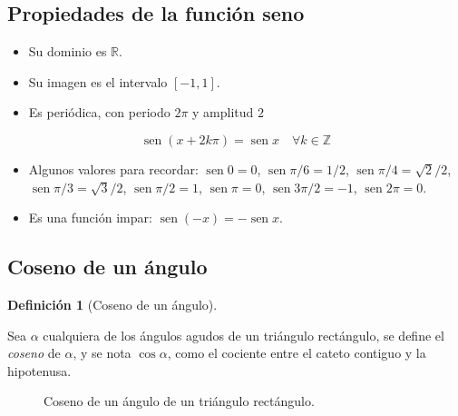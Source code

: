 \documentclass[
  a4paper,
]{scrreport}
\providecommand{\tightlist}{%
  \setlength{\itemsep}{0pt}\setlength{\parskip}{0pt}}\usepackage{longtable,booktabs,array}
\theoremstyle{plain}
\theoremstyle{plain}
\theoremstyle{definition}
\newtheorem{definition}{Definición}[chapter]
\theoremstyle{plain}
\theoremstyle{definition}
\theoremstyle{remark}
\begin{document}
\hypertarget{propiedades-de-la-funciuxf3n-seno}{%
\subsection{Propiedades de la función
seno}\label{propiedades-de-la-funciuxf3n-seno}}

\begin{itemize}
\tightlist
\item
  Su dominio es \(\mathbb{R}\).
\item
  Su imagen es el intervalo \([-1,1]\).
\item
  Es periódica, con periodo \(2\pi\) y amplitud \(2\)
\end{itemize}

\[\operatorname{sen} (x+2k\pi)= \operatorname{sen} x\quad \forall k\in \mathbb{Z}\]

\begin{itemize}
\tightlist
\item
  Algunos valores para recordar: \(\operatorname{sen} 0=0\),
  \(\operatorname{sen} \pi/6= 1/2\),
  \(\operatorname{sen} \pi/4=\sqrt{2}/2\),
  \(\operatorname{sen} \pi/3= \sqrt{3}/2\),
  \(\operatorname{sen} \pi/2 =1\), \(\operatorname{sen} \pi = 0\),
  \(\operatorname{sen} 3\pi/2=-1\), \(\operatorname{sen} 2\pi=0\).
\item
  Es una función impar:
  \(\operatorname{sen}(-x)=-\operatorname{sen} x\).
\end{itemize}

\hypertarget{coseno-de-un-uxe1ngulo}{%
\subsection{Coseno de un ángulo}\label{coseno-de-un-uxe1ngulo}}

\leavevmode{}%
\begin{definition}[Coseno de un ángulo]\label{def-coseno-angulo}

Sea \(\alpha\) cualquiera de los ángulos agudos de un triángulo
rectángulo, se define el \emph{coseno} de \(\alpha\), y se nota
\(\cos \alpha\), como el cociente entre el cateto contiguo y la
hipotenusa.

\end{definition}

\begin{figure}

{\centering 



}

\caption{Coseno de un ángulo de un triángulo rectángulo.}

\end{figure}
\end{document}
